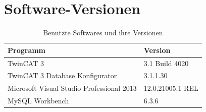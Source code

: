 \chapter{Software-Versionen}

\begin{table}[htb]
\centering
\caption{Benutzte Softwares und ihre Versionen}
\begin{tabular}{ll}
\hline 
\textbf{Programm} & \textbf{Version} \\ 
\hline 
\hline 
TwinCAT 3 & 3.1 Build 4020 \\ 
\hline 
TwinCAT 3 Database Konfigurator & 3.1.1.30 \\ 
\hline 
Microsoft Visual Studio Professional 2013 & 12.0.21005.1 REL \\ 
\hline 
MySQL Workbench & 6.3.6 \\ 
\hline 
\hline 
\end{tabular} 
\end{table}